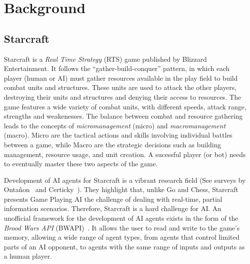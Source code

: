 \section{Background}\label{section:background}

\subsection{Starcraft}

Starcraft is a \emph{Real Time Strategy} (RTS) game published by
Blizzard Entertainment. It follows the ``gather-build-conquer''
pattern, in which each player (human or AI) must gather resources
available in the play field to build combat units and
structures. These units are used to attack the other players,
destroying their units and structures and denying their access to
resources. The game features a wide variety of combat units, with
different speeds, attack range, strengths and weakenesses. The balance
between combat and resource gathering leads to the concepts of
\emph{micromanagement} (micro) and \emph{macromanagement}
(macro). Micro are the tactical actions and skills involving
individual battles between a game, while Macro are the strategic
decisions such as building management, resource usage, and unit
creation. A sucessful player (or bot) needs to eventually master
these two aspects of the game.

Development of AI agents for Starcraft is a vibrant research field
(See surveys by Onta\~non~\cite{OnSyUrRiChPr13} and
Certicky~\cite{CeCh17}). They highlight that, unlike Go and Chess,
Starcraft presents Game Playing AI the challenge of dealing with
real-time, partial information scenarios. Therefore, Starcraft is a
hard challenge for AI. An unofficial framework for the development of
AI agents exists in the form of the \emph{Brood Wars API}
(BWAPI)~\cite{BWAPI}. It allows the user to read and write to the
game's memory, allowing a wide range of agent types, from agents that
control limited parts of an AI opponent, to agents with the same range
of inputs and outputs as a human player.


